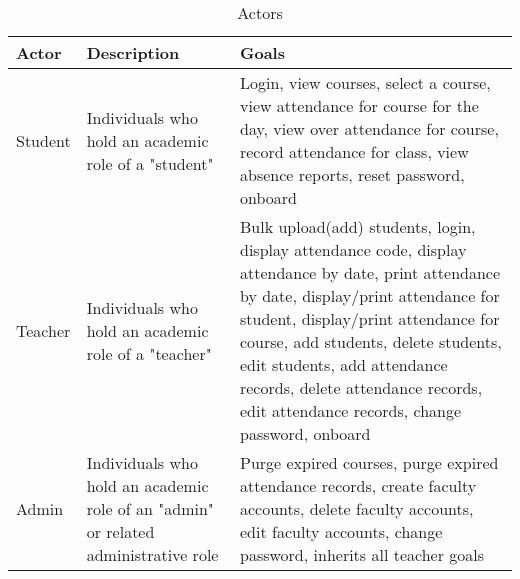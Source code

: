 \documentclass[letterpaper,12pt,oneside,listof=totoc]{scrreprt}
\begin{document}
\begin{table}[h]
    \centering
        \begin{tabular}{ || m{5em} | m{5cm}| m{5cm} || }
        \hline
        Actor&Description&Goals\\ 
        \hline\hline
        Student&Individuals who hold an academic role of a "student"&Login, view courses, select a course, view attendance for course for the day, view over attendance for course, record attendance for class, view absence reports, reset password, onboard\\
        \hline
        Teacher&Individuals who hold an academic role of a "teacher"&Bulk upload(add) students, login, display attendance code, display attendance by date, print attendance by date, display/print attendance for student, display/print attendance for course, add students, delete students, edit students, add attendance records, delete attendance records, edit attendance records, change password, onboard\\
        \hline
        Admin&Individuals who hold an academic role of an "admin" or related administrative role&Purge expired courses, purge expired attendance records, create faculty accounts, delete faculty accounts, edit faculty accounts, change password, inherits all teacher goals\\
    \hline
    \end{tabular}
    \caption{Actors}
    \label{tab:my_label}
\end{table}

\clearpage
\end{document}

